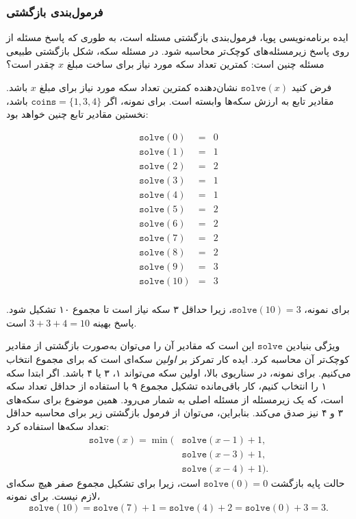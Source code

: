 \subsubsection{فرمول‌بندی بازگشتی}

ایده برنامه‌نویسی پویا، فرمول‌بندی بازگشتی مسئله است، به طوری که پاسخ مسئله از روی پاسخ زیرمسئله‌های کوچک‌تر محاسبه شود.
در مسئله سکه، شکل بازگشتی طبیعی مسئله چنین است:
کمترین تعداد سکه مورد نیاز برای ساخت مبلغ $x$ چقدر است؟

فرض کنید $\texttt{solve}(x)$ نشان‌دهنده کمترین تعداد سکه مورد نیاز برای مبلغ $x$ باشد.
مقادیر تابع به ارزش سکه‌ها وابسته است.
برای نمونه، اگر $\texttt{coins} = \{1,3,4\}$ باشد، نخستین مقادیر تابع چنین خواهد بود:

\[
\begin{array}{lcl}
\texttt{solve}(0) & = & 0 \\
\texttt{solve}(1) & = & 1 \\
\texttt{solve}(2) & = & 2 \\
\texttt{solve}(3) & = & 1 \\
\texttt{solve}(4) & = & 1 \\
\texttt{solve}(5) & = & 2 \\
\texttt{solve}(6) & = & 2 \\
\texttt{solve}(7) & = & 2 \\
\texttt{solve}(8) & = & 2 \\
\texttt{solve}(9) & = & 3 \\
\texttt{solve}(10) & = & 3 \\
\end{array}
\]

برای نمونه، $\texttt{solve}(10)=3$،
زیرا حداقل ۳ سکه نیاز است
تا مجموع ۱۰ تشکیل شود.
پاسخ بهینه $3+3+4=10$ است.

ویژگی بنیادین $\texttt{solve}$ این است
که مقادیر آن را می‌توان
به‌صورت بازگشتی از مقادیر کوچک‌تر آن محاسبه کرد.
ایده کار تمرکز بر \emph{اولین}
سکه‌ای است که برای مجموع انتخاب می‌کنیم.
برای نمونه، در سناریوی بالا،
اولین سکه می‌تواند ۱، ۳ یا ۴ باشد.
اگر ابتدا سکه ۱ را انتخاب کنیم،
کار باقی‌مانده تشکیل مجموع ۹
با استفاده از حداقل تعداد سکه است،
که یک زیرمسئله از مسئله اصلی به شمار می‌رود.
همین موضوع برای سکه‌های ۳ و ۴ نیز صدق می‌کند.
بنابراین، می‌توان از فرمول بازگشتی زیر
برای محاسبه حداقل تعداد سکه‌ها استفاده کرد:
\begin{equation*}
\begin{split}
\texttt{solve}(x) = \min( & \texttt{solve}(x-1)+1, \\
                           & \texttt{solve}(x-3)+1, \\
                           & \texttt{solve}(x-4)+1).
\end{split}
\end{equation*}
حالت پایه بازگشت $\texttt{solve}(0)=0$ است،
زیرا برای تشکیل مجموع صفر هیچ سکه‌ای لازم نیست.
برای نمونه،
\[ \texttt{solve}(10) = \texttt{solve}(7)+1 = \texttt{solve}(4)+2 = \texttt{solve}(0)+3 = 3.\]

